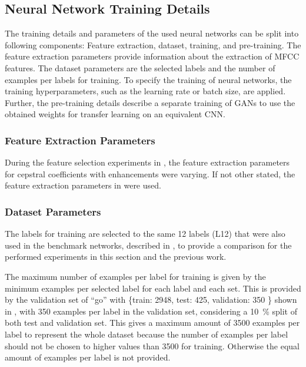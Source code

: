 
\subsection{Neural Network Training Details}\label{sec:exp_details_training}
The training details and parameters of the used neural networks can be split into following components: Feature extraction, dataset, training, and pre-training.
The feature extraction parameters provide information about the extraction of MFCC features.
The dataset parameters are the selected labels and the number of examples per labels for training.
To specify the training of neural networks, the training hyperparameters, such as the learning rate or batch size, are applied.
Further, the pre-training details describe a separate training of GANs to use the obtained weights for transfer learning on an equivalent CNN.



\subsubsection{Feature Extraction Parameters}
During the feature selection experiments in , the feature extraction parameters for cepstral coefficients with enhancements were varying.
If not other stated, the feature extraction parameters in  were used.




\subsubsection{Dataset Parameters}
The labels for training are selected to the same 12 labels (L12) that were also used in the benchmark networks, described in , to provide a comparison for the performed experiments in this section and the previous work.

The maximum number of examples per label for training is given by the minimum examples per selected label for each label and each set.
This is provided by the validation set of \enquote{go} with \{train: 2948, test: 425, validation: 350 \} shown in , with 350 examples per label in the validation set, considering a \SI{10}{\percent} split of both test and validation set.
This gives a maximum amount of 3500 examples per label to represent the whole dataset because the number of examples per label should not be chosen to higher values than 3500 for training.
Otherwise the equal amount of examples per label is not provided.

